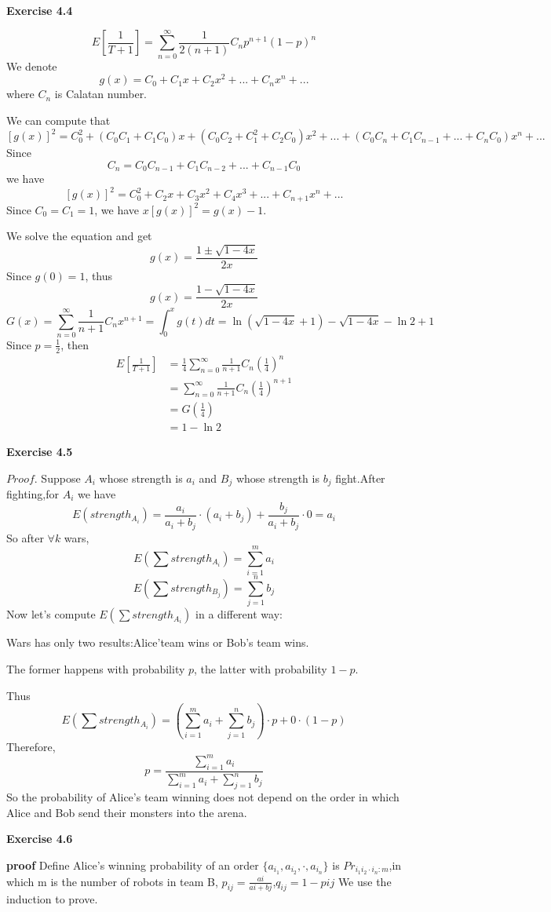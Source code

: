 \documentclass{article} %
\begin{document}
	\textbf{Exercise 4.4}\par
	$$E[\frac{1}{T+1}]=\sum_{n=0}^\infty \frac{1}{2(n+1)}C_{n}p^{n+1}(1-p)^{n}$$
	We denote $$g(x)=C_0+C_1x+C_2x^2+...+C_{n}x^{n}+...$$ where $C_{n}$ is Calatan number.\par
	We can compute that $$[g(x)]^2=C_0^2+(C_0C_1+C_1C_0)x+(C_0C_2+C_1^2+C_2C_0)x^2+...+(C_0C_{n}+C_1C_{n-1}+...+C_{n}C_0)x^{n}+...$$
	Since $$C_{n}=C_0C_{n-1}+C_1C_{n-2}+...+C_{n-1}C_0$$
	we have $$[g(x)]^2=C_0^2+C_2x+C_3x^2+C_4x^3+...+C_{n+1}x^{n}+...$$
	Since $C_0=C_1=1$, we have $x[g(x)]^2=g(x)-1$.\par
	We solve the equation and get
	$$g(x)=\frac{1\pm\sqrt{1-4x}}{2x}$$
	Since $g(0)=1$, thus 
	$$g(x)=\frac{1-\sqrt{1-4x}}{2x}$$
	$$G(x)=\sum_{n=0}^\infty \frac{1}{n+1}C_{n}x^{n+1}=\int_{0}^{x} g(t)dt=\ln(\sqrt{1-4x}+1)-\sqrt{1-4x}-\ln 2+1$$
	Since $p=\frac{1}{2}$, then 
	\begin{align*}
	E[\frac{1}{T+1}]&=\frac{1}{4}\sum_{n=0}^\infty \frac{1}{n+1}C_{n}(\frac{1}{4})^n\\
	&=\sum_{n=0}^\infty \frac{1}{n+1}C_{n}(\frac{1}{4})^{n+1}\\
	&=G(\frac{1}{4})\\
	&=1-\ln 2
	\end{align*}

    \textbf{Exercise 4.5}\par
    $Proof$.
    Suppose $A_i$ whose strength is $a_i$ and $B_j$ whose strength is $b_j$ fight.After fighting,for $A_i$ we have
    $$
    E(strength_{A_i})=\frac{a_i}{a_i+b_j}\cdot (a_i+b_j)+\frac{b_j}{a_i+b_j}\cdot 0=a_i
    $$
    So after $\forall k$ wars,
    $$
    E(\sum strength_{A_i})=\sum_{i=1}^{m}a_i
    $$
    $$
    E(\sum strength_{B_j})=\sum_{j=1}^{n}b_j
    $$
    Now let's compute $E(\sum strength_{A_i})$ in a different way:\par
    Wars has only two results:Alice'team wins or Bob's team wins.\par
    The former happens with probability $p$,
    the latter with probability $1-p$.\par
    Thus
    $$
    E(\sum strength_{A_i})=(\sum_{i=1}^{m}a_i+\sum_{j=1}^{n}b_j)\cdot p+0\cdot (1-p)
    $$
    Therefore,
    $$
    p=\frac{\sum_{i=1}^{m}a_i}{\sum_{i=1}^{m}a_i+\sum_{j=1}^{n}b_j}
    $$
    So the probability of Alice's team winning does not depend on the order in which Alice and Bob send their monsters into the arena.
 
   \textbf{Exercise 4.6}\par
	\textbf{proof} Define Alice's winning probability of an order $\{a_{i_1},a_{i_2},\cdot,a_{i_n}\}$ is $Pr_{i_1i_2 \cdot i_n:m}$,in which m is the number of robots in team B, $p_{ij}=\frac{ai}{ai+bj}$,$q_{ij}=1-p{ij}$  We use the induction to prove.\\
\end{document}
